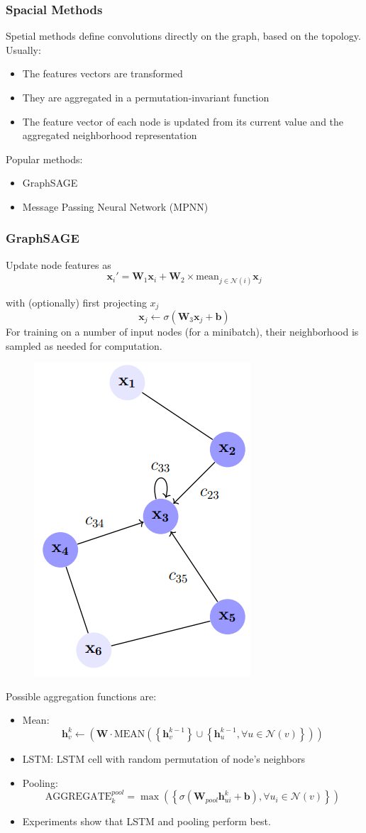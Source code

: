 \subsubsection{Spacial Methods}
Spetial methods define convolutions directly on the graph, based on the topology.
Usually:
\begin{itemize}
    \item The features vectors are transformed
    \item They are aggregated in a permutation-invariant function
    \item The feature vector of each node is updated from its current value and the aggregated neighborhood representation
\end{itemize}
Popular methods:
\begin{itemize}
    \item GraphSAGE
    \item Message Passing Neural Network (MPNN) 
\end{itemize}
\subsubsection*{GraphSAGE}
Update node features as
\[
\mathbf{x}_i' = \mathbf{W}_1\mathbf{x}_i + \mathbf{W}_2 \times \text{mean}_{j \in \mathcal{N}(i)}\mathbf{x}_j
\]

with (optionally) first projecting \(x_j\)
\[
\mathbf{x}_j \leftarrow \sigma (\mathbf{W}_3 \mathbf{x}_j + \mathbf{b})
\]
For training on a number of input nodes (for a minibatch), their neighborhood is sampled as needed for computation.
\begin{figure}[!h]
    \centering
    \includegraphics[width = 0.3\columnwidth]{figures/GraphNeuralNetworks2/GCN.png}
\end{figure}
Possible aggregation functions are:
\begin{itemize}
    \item Mean:
    \[
        \mathbf{h}_v^k \leftarrow (\mathbf{W} \cdot \text{MEAN}(\left\{\mathbf{h}_v^{k-1}\right\}\cup\left\{\mathbf{h}_u^{k-1},\forall u \in \mathcal{N}(v)\right\}))
    \]
    \item LSTM: LSTM cell with random permutation of node's neighbors
    \item Pooling:
    \[
        \text{AGGREGATE}_k^{pool} = \max\left(\left\{\sigma(\mathbf{W}_{pool}\mathbf{h}_{ui}^k + \mathbf{b}),\forall u_i \in \mathcal{N}(v)\right\}\right)
    \]
    \item Experiments show that LSTM and pooling perform best.
\end{itemize}


